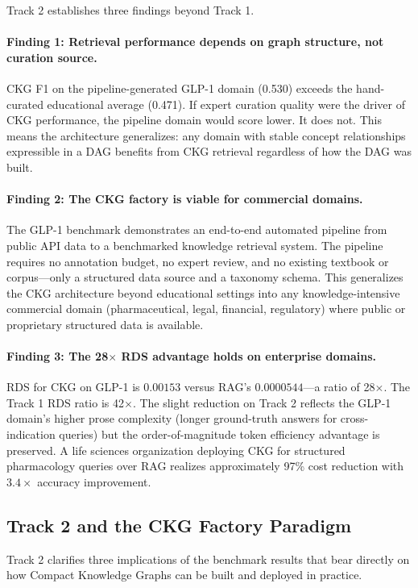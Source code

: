 Track 2 establishes three findings beyond Track 1.

\paragraph{Finding 1: Retrieval performance depends on graph structure, not curation source.}
CKG F1 on the pipeline-generated GLP-1 domain (0.530) exceeds the
hand-curated educational average (0.471). If expert curation quality were
the driver of CKG performance, the pipeline domain would score lower. It
does not. This means the architecture generalizes: any domain with
stable concept relationships expressible in a DAG benefits from CKG
retrieval regardless of how the DAG was built.

\paragraph{Finding 2: The CKG factory is viable for commercial domains.}
The GLP-1 benchmark demonstrates an end-to-end automated pipeline
from public API data to a benchmarked knowledge retrieval system. The
pipeline requires no annotation budget, no expert review, and no existing
textbook or corpus---only a structured data source and a taxonomy schema.
This generalizes the CKG architecture beyond educational settings into
any knowledge-intensive commercial domain (pharmaceutical, legal, financial,
regulatory) where public or proprietary structured data is available.

\paragraph{Finding 3: The 28$\times$ RDS advantage holds on enterprise domains.}
RDS for CKG on GLP-1 is $0.00153$ versus RAG's $0.0000544$---a ratio of
28$\times$. The Track 1 RDS ratio is 42$\times$. The slight reduction on
Track 2 reflects the GLP-1 domain's higher prose complexity (longer
ground-truth answers for cross-indication queries) but the order-of-magnitude
token efficiency advantage is preserved. A life sciences organization
deploying CKG for structured pharmacology queries over RAG realizes
approximately 97\% cost reduction with $3.4\times$ accuracy improvement.

\subsection{Track 2 and the CKG Factory Paradigm}

Track 2 clarifies three implications of the benchmark results that bear
directly on how Compact Knowledge Graphs can be built and deployed in
practice.

